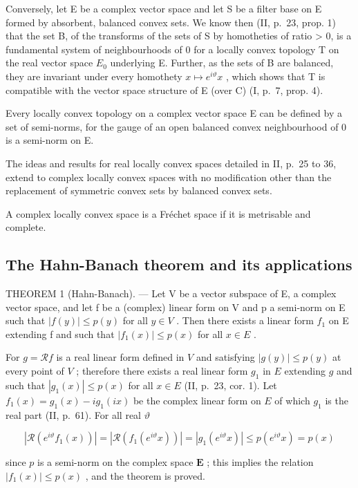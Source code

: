 Conversely, let E be a complex vector space and let S be a filter base on E formed by absorbent, balanced convex sets. We know then (II, p.~23, prop. 1) that the set B, of the transforms of the sets of S by homotheties of ratio \textgreater{} 0, is a fundamental system of neighbourhoods of 0 for a locally convex topology T on the real vector space \(E_{0}\) underlying E. Further, as the sets of B are balanced, they are invariant under every homothety \(x \mapsto e^{i\vartheta}x\) , which shows that T is compatible with the vector space structure of E (over C) (I, p.~7, prop. 4).

Every locally convex topology on a complex vector space E can be defined by a set of semi-norms, for the gauge of an open balanced convex neighbourhood of 0 is a semi-norm on E.

The ideas and results for real locally convex spaces detailed in II, p.~25 to 36, extend to complex locally convex spaces with no modification other than the replacement of symmetric convex sets by balanced convex sets.

A complex locally convex space is a Fréchet space if it is metrisable and complete.

\subsection{The Hahn-Banach theorem and its applications}

THEOREM 1 (Hahn-Banach). --- Let V be a vector subspace of E, a complex vector space, and let f be a (complex) linear form on V and p a semi-norm on E such that \(|f(y)| \leqslant p(y)\) for all \(y \in V\) . Then there exists a linear form \(f_{1}\) on E extending f and such that \(|f_{1}(x)| \leqslant p(x)\) for all \(x \in E\) .

For \(g = \mathcal{R}f\) is a real linear form defined in \(V\) and satisfying \(|g(y)| \leqslant p(y)\) at every point of \(V\) ; therefore there exists a real linear form \(g_1\) in \(E\) extending \(g\) and such that \(|g_1(x)| \leqslant p(x)\) for all \(x \in E\) (II, p.~23, cor. 1). Let \(f_1(x) = g_1(x) - ig_1(ix)\) be the complex linear form on \(E\) of which \(g_1\) is the real part (II, p.~61). For all real \(\vartheta\)

\[
\left| \mathcal {R} (e ^ {i \vartheta} f _ {1} (x)) \right| = \left| \mathcal {R} (f _ {1} (e ^ {i \vartheta} x)) \right| = \left| g _ {1} (e ^ {i \vartheta} x) \right| \leqslant p (e ^ {i \vartheta} x) = p (x)
\]

since \(p\) is a semi-norm on the complex space \(\mathbf{E}\) ; this implies the relation \(|f_1(x)| \leqslant p(x)\) , and the theorem is proved.

